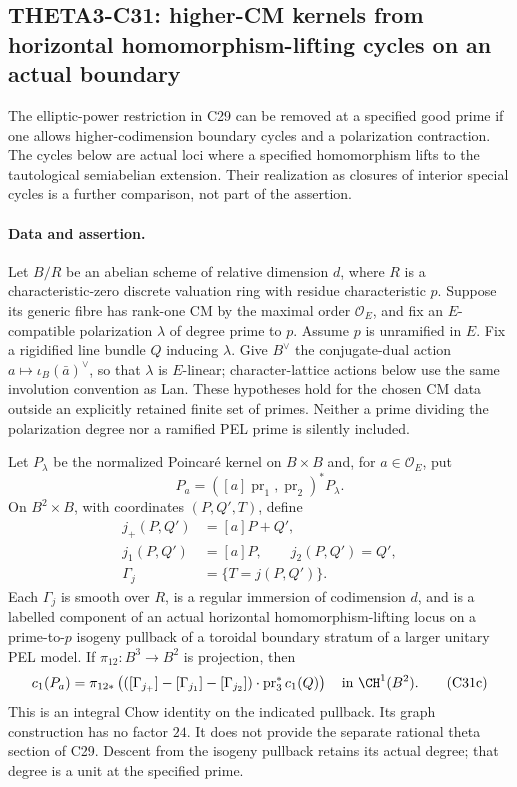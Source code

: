 \subsection{THETA3-C31: higher-CM kernels from horizontal homomorphism-lifting cycles on an actual boundary}\label{C31}

The elliptic-power restriction in C29 can be removed at a specified
good prime if one allows higher-codimension boundary cycles and a
polarization contraction. The cycles below are actual loci where
a specified homomorphism lifts to the tautological semiabelian
extension. Their realization as closures of interior special cycles
is a further comparison, not part of the assertion.

\paragraph{Data and assertion.}
Let $B/R$ be an abelian scheme of relative dimension $d$, where
$R$ is a characteristic-zero discrete valuation ring with residue
characteristic $p$. Suppose its generic fibre has rank-one CM by
the maximal order $\mathcal O_E$, and fix an $E$-compatible
polarization $\lambda$ of degree prime to $p$. Assume $p$ is
unramified in $E$. Fix a rigidified line bundle $Q$ inducing
$\lambda$. Give $B^\vee$ the conjugate-dual action
$a\mapsto\iota_B(\bar a)^\vee$, so that $\lambda$ is
$E$-linear; character-lattice actions below use the same
involution convention as Lan. These hypotheses hold for the chosen CM data outside
an explicitly retained finite set of primes. Neither a prime
dividing the polarization degree nor a ramified PEL prime is
silently included.

Let $P_\lambda$ be the normalized Poincar\'e kernel on $B\times B$
and, for $a\in\mathcal O_E$, put
\[
 P_a=([a]\operatorname{pr}_1,\operatorname{pr}_2)^*P_\lambda.
 \tag{C31a}
\]
On $B^2\times B$, with coordinates $(P,Q',T)$, define
\[
 \begin{aligned}
 j_+(P,Q')&=[a]P+Q',\\
 j_1(P,Q')&=[a]P,\qquad j_2(P,Q')=Q',\\
 \Gamma_j&=\{T=j(P,Q')\}.
 \end{aligned}
 \tag{C31b}
\]
Each $\Gamma_j$ is smooth over $R$, is a regular immersion of
codimension $d$, and is a labelled component of an actual
horizontal homomorphism-lifting locus on a prime-to-$p$ isogeny
pullback of a toroidal boundary stratum of a larger unitary PEL
model. If $\pi_{12}:B^3\to B^2$ is projection, then
\[
 c_1(P_a)=\pi_{12*}\left(
   ([\Gamma_{j_+}]-[\Gamma_{j_1}]-[\Gamma_{j_2}])
                  \cdot\operatorname{pr}_3^*c_1(Q)\right)
                  \quad\hbox{in }\CH^1(B^2).
 \tag{C31c}
\]
This is an integral Chow identity on the indicated pullback.
Its graph construction has no factor $24$. It does not provide
the separate rational theta section of C29. Descent from the
isogeny pullback retains its actual degree; that degree is a
unit at the specified prime.

